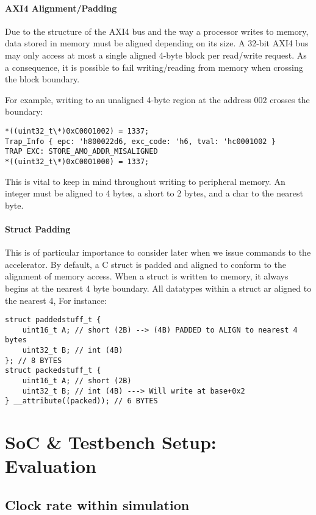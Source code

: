 \documentclass[a4paper,8pt]{report}
\begin{document}

\subsubsection{AXI4 Alignment/Padding}
Due to the structure of the AXI4 bus and the way a processor writes to memory,
data stored in memory must be aligned depending on its size.
A 32-bit AXI4 bus may only access at most a single aligned
4-byte block per read/write request. As a consequence, it is possible to fail
writing/reading from memory when crossing the block boundary.

For example, writing to an unaligned 4-byte region at the address $002$ crosses
the boundary:
\begin{verbatim}
*((uint32_t\*)0xC0001002) = 1337;
Trap_Info { epc: 'h800022d6, exc_code: 'h6, tval: 'hc0001002 }
TRAP EXC: STORE_AMO_ADDR_MISALIGNED
*((uint32_t\*)0xC0001000) = 1337;
\end{verbatim}

This is vital to keep in mind throughout writing to peripheral memory. An
integer must be aligned to 4 bytes, a short to 2 bytes, and a char to the
nearest byte. 

\subsubsection{Struct Padding}
This is of particular importance to consider later when we issue commands to the
accelerator. By default, a C struct is padded and aligned to conform to the
alignment of memory access. When a struct is written to memory, it always begins
at the nearest 4 byte boundary. All datatypes within a struct ar aligned to the
nearest 4, For instance:

\begin{verbatim}
struct paddedstuff_t {
    uint16_t A; // short (2B) --> (4B) PADDED to ALIGN to nearest 4 bytes
    uint32_t B; // int (4B)
}; // 8 BYTES
struct packedstuff_t {
    uint16_t A; // short (2B)
    uint32_t B; // int (4B) ---> Will write at base+0x2
} __attribute((packed)); // 6 BYTES
\end{verbatim}


\chapter{SoC \& Testbench Setup: Evaluation}
\section{Clock rate within simulation}
\end{document}
